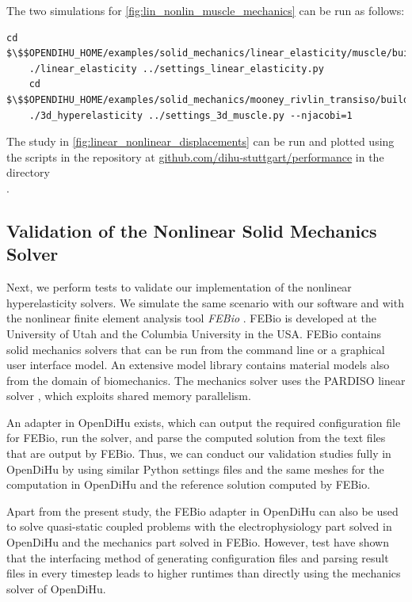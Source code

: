 \begin{reproduce_no_break}
  The two simulations for \cref{fig:lin_nonlin_muscle_mechanics} can be run as follows:
  \begin{lstlisting}[columns=fullflexible,breaklines=true,postbreak=\mbox{\textcolor{gray}{$\hookrightarrow$}\space}]
    cd $\$$OPENDIHU_HOME/examples/solid_mechanics/linear_elasticity/muscle/build_release
    ./linear_elasticity ../settings_linear_elasticity.py
    cd $\$$OPENDIHU_HOME/examples/solid_mechanics/mooney_rivlin_transiso/build_release
    ./3d_hyperelasticity ../settings_3d_muscle.py --njacobi=1
  \end{lstlisting}
  The study in \cref{fig:linear_nonlinear_displacements} can be run and plotted using the scripts in the repository at \href{https://github.com/dihu-stuttgart/performance}{github.com/dihu-stuttgart/performance}
  in the directory \\.
\end{reproduce_no_break}

\subsection{Validation of the Nonlinear Solid Mechanics Solver}\label{sec:validation_nonlinear}

Next, we perform tests to validate our implementation of the nonlinear hyperelasticity solvers.
We simulate the same scenario with our software and with the nonlinear finite element analysis tool \emph{FEBio} \cite{Maas2012}.
FEBio is developed at the University of Utah and the Columbia University in the USA. FEBio contains solid mechanics solvers that can be run from the command line or a graphical user interface model. An extensive model library contains material models also from the domain of biomechanics. The mechanics solver uses the PARDISO linear solver \cite{pardiso2020}, which exploits shared memory parallelism.

An adapter in OpenDiHu exists, which can output the required configuration file for FEBio, run the solver, and parse the computed solution from the text files that are output by FEBio. Thus, we can conduct our validation studies fully in OpenDiHu by using similar Python settings files and the same meshes for the computation in OpenDiHu and the reference solution computed by FEBio.

Apart from the present study, the FEBio adapter in OpenDiHu can also be used to solve quasi-static coupled problems with the electrophysiology part solved in OpenDiHu and the mechanics part solved in FEBio. However, test have shown that the interfacing method of generating configuration files and parsing result files in every timestep leads to higher runtimes than directly using the mechanics solver of OpenDiHu.

